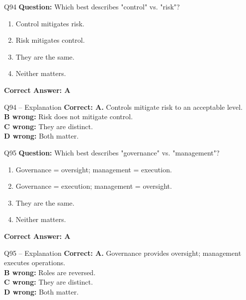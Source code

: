 \documentclass[aspectratio=169,10pt]{beamer}
\begin{document}
	\begin{frame}[t]{Q94}
		\small
		\textbf{Question:} Which best describes "control" vs. "risk"?
		\begin{enumerate}[label=\Alph*.,itemsep=1pt,topsep=2pt]
			\item Control mitigates risk.
			\item Risk mitigates control.
			\item They are the same.
			\item Neither matters.
		\end{enumerate}
		\vspace{4pt}
		\textbf{Correct Answer: A}
	\end{frame}
	
	\begin{frame}[t]{Q94 -- Explanation}
		\small
		\textbf{Correct: A.} Controls mitigate risk to an acceptable level. \\[4pt]
		\textbf{B wrong:} Risk does not mitigate control. \\[2pt]
		\textbf{C wrong:} They are distinct. \\[2pt]
		\textbf{D wrong:} Both matter.
	\end{frame}
	
	\begin{frame}[t]{Q95}
		\small
		\textbf{Question:} Which best describes "governance" vs. "management"?
		\begin{enumerate}[label=\Alph*.,itemsep=1pt,topsep=2pt]
			\item Governance = oversight; management = execution.
			\item Governance = execution; management = oversight.
			\item They are the same.
			\item Neither matters.
		\end{enumerate}
		\vspace{4pt}
		\textbf{Correct Answer: A}
	\end{frame}
	
	\begin{frame}[t]{Q95 -- Explanation}
		\small
		\textbf{Correct: A.} Governance provides oversight; management executes operations. \\[4pt]
		\textbf{B wrong:} Roles are reversed. \\[2pt]
		\textbf{C wrong:} They are distinct. \\[2pt]
		\textbf{D wrong:} Both matter.
	\end{frame}
	
\end{document}
